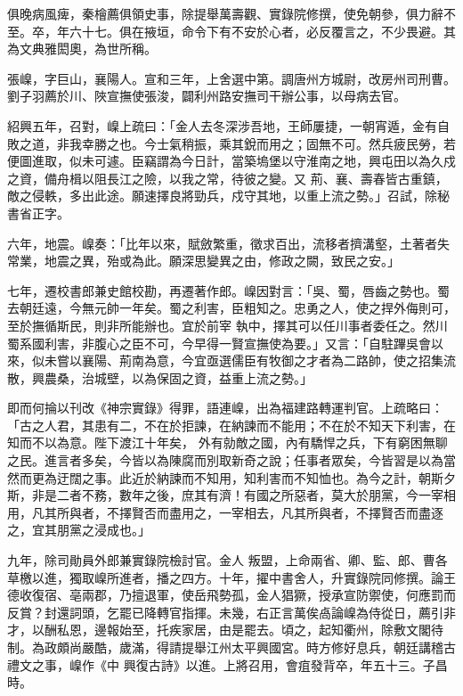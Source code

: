 \begin{pinyinscope}
 俱晚病風痺，秦檜薦俱領史事，除提舉萬壽觀、實錄院修撰，使免朝參，俱力辭不至。卒，年六十七。俱在掖垣，命令下有不安於心者，必反覆言之，不少畏避。其為文典雅閎奧，為世所稱。



 張嵲，字巨山，襄陽人。宣和三年，上舍選中第。調唐州方城尉，改房州司刑曹。劉子羽薦於川、陜宣撫使張浚，闢利州路安撫司干辦公事，以母病去官。



 紹興五年，召對，嵲上疏曰：「金人去冬深涉吾地，王師屢捷，一朝宵遁，金有自敗之道，非我幸勝之也。今士氣稍振，乘其銳而用之；固無不可。然兵疲民勞，若便圖進取，似未可遽。臣竊謂為今日計，當築塢堡以守淮南之地，興屯田以為久戍之資，備舟楫以阻長江之險，以我之常，待彼之變。又
 荊、襄、壽春皆古重鎮，敵之侵軼，多出此途。願速擇良將勁兵，戍守其地，以重上流之勢。」召試，除秘書省正字。



 六年，地震。嵲奏：「比年以來，賦斂繁重，徵求百出，流移者擠溝壑，土著者失常業，地震之異，殆或為此。願深思變異之由，修政之闕，致民之安。」



 七年，遷校書郎兼史館校勘，再遷著作郎。嵲因對言：「吳、蜀，唇齒之勢也。蜀去朝廷遠，今無元帥一年矣。蜀之利害，臣粗知之。忠勇之人，使之捍外侮則可，至於撫循斯民，則非所能辦也。宜於前宰
 執中，擇其可以任川事者委任之。然川蜀系國利害，非腹心之臣不可，今早得一賢宣撫使為要。」又言：「自駐蹕吳會以來，似未嘗以襄陽、荊南為意，今宜亟選儒臣有牧御之才者為二路帥，使之招集流散，興農桑，治城壁，以為保固之資，益重上流之勢。」



 即而何掄以刊改《神宗實錄》得罪，語連嵲，出為福建路轉運判官。上疏略曰：「古之人君，其患有二，不在於拒諫，在納諫而不能用；不在於不知天下利害，在知而不以為意。陛下渡江十年矣，
 外有勍敵之國，內有驕悍之兵，下有窮困無聊之民。進言者多矣，今皆以為陳腐而別取新奇之說；任事者眾矣，今皆習是以為當然而更為迂闊之事。此近於納諫而不知用，知利害而不知恤也。為今之計，朝斯夕斯，非是二者不務，數年之後，庶其有濟！有國之所惡者，莫大於朋黨，今一宰相用，凡其所與者，不擇賢否而盡用之，一宰相去，凡其所與者，不擇賢否而盡逐之，宜其朋黨之浸成也。」



 九年，除司勛員外郎兼實錄院檢討官。金人
 叛盟，上命兩省、卿、監、郎、曹各草檄以進，獨取嵲所進者，播之四方。十年，擢中書舍人，升實錄院同修撰。論王德收復宿、亳兩郡，乃擅退軍，使岳飛勢孤，金人猖獗，授承宣防禦使，何應罰而反賞？封還詞頭，乞罷已降轉官指揮。未幾，右正言萬俟卨論嵲為侍從日，薦引非才，以酬私恩，邊報始至，托疾家居，由是罷去。頃之，起知衢州，除敷文閣待制。為政頗尚嚴酷，歲滿，得請提舉江州太平興國宮。時方修好息兵，朝廷講稽古禮文之事，嵲作《中
 興復古詩》以進。上將召用，會疽發背卒，年五十三。子昌時。




\end{pinyinscope}
